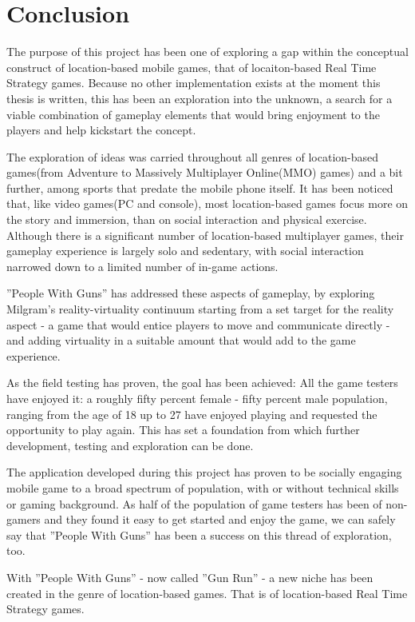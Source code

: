 
\section{Conclusion}

The purpose of this project has been one of exploring a gap within the
conceptual construct of location-based mobile games, that of locaiton-based Real
Time Strategy games. Because no other implementation exists at the moment this
thesis is written, this has been an exploration into the unknown, a search for a
viable combination of gameplay elements that would bring enjoyment to the
players and help kickstart the concept.\newline

The exploration of ideas was carried throughout all genres of location-based
games(from Adventure to Massively Multiplayer Online(MMO) games) and a bit
further, among sports that predate the mobile phone itself. It has been noticed
that, like video games(PC and console), most location-based games focus more on
the story and immersion, than on social interaction and physical exercise.
Although there is a significant number of location-based multiplayer games,
their gameplay experience is largely solo and sedentary, with social interaction
narrowed down to a limited number of in-game actions.\newline

''People With Guns'' has addressed these aspects of gameplay, by exploring
Milgram's reality-virtuality continuum starting from a set target for the
reality aspect - a game that would entice players to move and communicate
directly - and adding virtuality in a suitable amount that would add to the game
experience.\newline

As the field testing has proven, the goal has been achieved: All the game
testers have enjoyed it: a roughly fifty percent female - fifty percent male
population, ranging from the age of 18 up to 27 have enjoyed playing and
requested the opportunity to play again. This has set a foundation from
which further development, testing and exploration can be done.\newline

The application developed during this project has proven to be socially engaging
mobile game to a broad spectrum of population, with or without technical skills
or gaming background. As half of the population of game testers has been of
non-gamers and they found it easy to get started and enjoy the game, we can
safely say that ''People With Guns'' has been a success on this thread of
exploration, too. \newline

With ''People With Guns'' - now called ''Gun Run'' - a new niche has been
created in the genre of location-based games. That is of location-based Real Time
Strategy games.\newline

